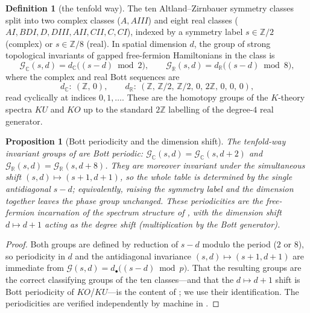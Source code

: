 \documentclass[12pt]{article}
\newcommand{\Zp}{\mathbb{Z}}
\newtheorem{proposition}[proposition]{Proposition}
\theoremstyle{definition}
\newtheorem{definition}[definition]{Definition}
\theoremstyle{remark}
\theoremstyle{plain}
\begin{document}
\begin{definition}[the tenfold way]
\label{def:tenfold}
The ten Altland--Zirnbauer symmetry classes~\cite{altland-zirnbauer} split into
two complex classes ($A,\mathit{AIII}$) and eight real classes
($\mathit{AI},\mathit{BDI},D,\mathit{DIII},\mathit{AII},\mathit{CII},C,\mathit{CI}$),
indexed by a symmetry label $s\in\Zp/2$ (complex) or $s\in\Zp/8$ (real). In
spatial dimension $d$, the group of strong topological invariants of gapped
free-fermion Hamiltonians in the class is
\[
  \mathcal G_{\mathbb C}(s,d)=d_{\mathbb C}\bigl((s-d)\bmod 2\bigr),
  \qquad
  \mathcal G_{\mathbb R}(s,d)=d_{\mathbb R}\bigl((s-d)\bmod 8\bigr),
\]
where the complex and real Bott sequences are
\[
  d_{\mathbb C}:\ (\Zp,\,0),\qquad
  d_{\mathbb R}:\ (\Zp,\,\Zp/2,\,\Zp/2,\,0,\,2\Zp,\,0,\,0,\,0),
\]
read cyclically at indices $0,1,\dots$. These are the homotopy groups of the
$K$-theory spectra $KU$ and $KO$ up to the standard $2\Zp$ labelling of the
degree-$4$ real generator.
\end{definition}

\begin{proposition}[Bott periodicity and the dimension shift]
\label{prop:bott}
The tenfold-way invariant groups of  are Bott periodic:
$\mathcal G_{\mathbb C}(s,d)=\mathcal G_{\mathbb C}(s,d+2)$ and
$\mathcal G_{\mathbb R}(s,d)=\mathcal G_{\mathbb R}(s,d+8)$. They are moreover
invariant under the simultaneous shift $(s,d)\mapsto(s+1,d+1)$, so the whole table
is determined by the single antidiagonal $s-d$; equivalently, raising the
symmetry label and the dimension together leaves the phase group unchanged. These
periodicities are the free-fermion incarnation of the spectrum structure of
, with the dimension shift $d\mapsto d+1$ acting as the
degree shift (multiplication by the Bott generator).
\end{proposition}

\begin{proof}
Both groups are defined by reduction of $s-d$ modulo the period ($2$ or $8$), so
periodicity in $d$ and the antidiagonal invariance $(s,d)\mapsto(s+1,d+1)$ are
immediate from
$\mathcal G(s,d)=d_\bullet\bigl((s-d)\bmod p\bigr)$. That the resulting groups
are the correct classifying groups of the ten classes---and that the
$d\mapsto d+1$ shift is Bott periodicity of $KO$/$KU$---is the content of
\cite{kitaev-periodic-table,thiang-ktheory}; we use their identification. The
periodicities are verified independently by machine in .
\end{proof}
\end{document}
